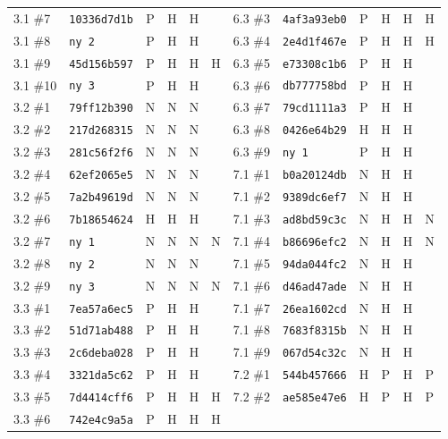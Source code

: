 {\begin{longtable}{@{}llcccc@{\hspace{2em}}llcccc@{}}
    3.1 \#7 & \texttt{10336d7d1b} & P & H & H & &
     6.3 \#3 & \texttt{4af3a93eb0} & P & H & H & H \\
    3.1 \#8 & \texttt{ny 2} & P & H & H & &
     6.3 \#4 & \texttt{2e4d1f467e} & P & H & H & H \\
    3.1 \#9 & \texttt{45d156b597} & P & H & H & H &
     6.3 \#5 & \texttt{e73308c1b6} & P & H & H &  \\
    3.1 \#10 & \texttt{ny 3} & P & H & H & &
     6.3 \#6 & \texttt{db777758bd} & P & H & H &  \\
    3.2 \#1 & \texttt{79ff12b390} & N & N & N & &
     6.3 \#7 & \texttt{79cd1111a3} & P & H & H &  \\
    3.2 \#2 & \texttt{217d268315} & N & N & N & &
     6.3 \#8 & \texttt{0426e64b29} & H & H & H &  \\
    3.2 \#3 & \texttt{281c56f2f6} & N & N & N & &
     6.3 \#9 & \texttt{ny 1} & P & H & H &  \\
    3.2 \#4 & \texttt{62ef2065e5} & N & N & N & &
     7.1 \#1 & \texttt{b0a20124db} & N & H & H &  \\
    3.2 \#5 & \texttt{7a2b49619d} & N & N & N & &
     7.1 \#2 & \texttt{9389dc6ef7} & N & H & H &  \\
    3.2 \#6 & \texttt{7b18654624} & H & H & H & &
     7.1 \#3 & \texttt{ad8bd59c3c} & N & H & H & N \\
    3.2 \#7 & \texttt{ny 1} & N & N & N & N &
     7.1 \#4 & \texttt{b86696efc2} & N & H & H & N \\
    3.2 \#8 & \texttt{ny 2} & N & N & N & &
     7.1 \#5 & \texttt{94da044fc2} & N & H & H &  \\
    3.2 \#9 & \texttt{ny 3} & N & N & N & N &
     7.1 \#6 & \texttt{d46ad47ade} & N & H & H &  \\
    3.3 \#1 & \texttt{7ea57a6ec5} & P & H & H & &
     7.1 \#7 & \texttt{26ea1602cd} & N & H & H &  \\
    3.3 \#2 & \texttt{51d71ab488} & P & H & H & &
     7.1 \#8 & \texttt{7683f8315b} & N & H & H &  \\
    3.3 \#3 & \texttt{2c6deba028} & P & H & H & &
     7.1 \#9 & \texttt{067d54c32c} & N & H & H &  \\
    3.3 \#4 & \texttt{3321da5c62} & P & H & H & &
     7.2 \#1 & \texttt{544b457666} & H & P & H & P \\
    3.3 \#5 & \texttt{7d4414cff6} & P & H & H & H &
     7.2 \#2 & \texttt{ae585e47e6} & H & P & H & P \\
    3.3 \#6 & \texttt{742e4c9a5a} & P & H & H & H &

\end{longtable}}
